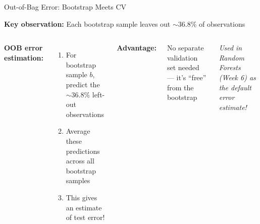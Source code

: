 \documentclass[aspectratio=169, 11pt]{beamer}
\begin{document}
\begin{frame}{Out-of-Bag Error: Bootstrap Meets CV}

\textbf{Key observation:} Each bootstrap sample leaves out $\sim 36.8\%$ of observations

\begin{columns}
\textbf{OOB error estimation:}

\begin{enumerate}
  \item For bootstrap sample $b$, predict the $\sim 36.8\%$ left-out observations
  \item Average these predictions across all bootstrap samples
  \item This gives an estimate of test error!
\end{enumerate}

\vspace{0.3em}
\textbf{Advantage:}

No separate validation set needed --- it's ``free'' from the bootstrap


\vspace{0.3em}
\textit{Used in Random Forests (Week 6) as the default error estimate!}
\end{columns}
\end{frame}
\end{document}
